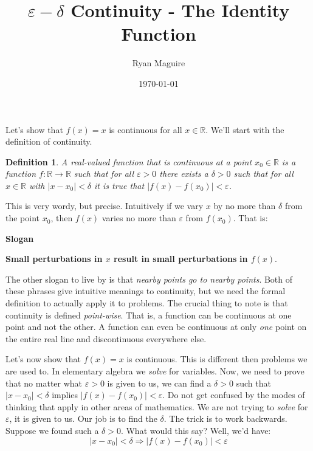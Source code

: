 \documentclass{article}
\title{$\varepsilon-\delta$ Continuity - The Identity Function}
\author{Ryan Maguire}
\date{\today}
\theoremstyle{normal}
\newtheorem{definition}{Definition}
\begin{document}
    \maketitle
    Let's show that $f(x)=x$ is continuous for all $x\in\mathbb{R}$. We'll
    start with the definition of continuity.
    \begin{definition}
        A real-valued function that is continuous at a point
        $x_{0}\in\mathbb{R}$ is a function $f:\mathbb{R}\rightarrow\mathbb{R}$
        such that for all $\varepsilon>0$ there exists a $\delta>0$ such that
        for all $x\in\mathbb{R}$ with $|x-x_{0}|<\delta$ it is true that
        $|f(x)-f(x_{0})|<\varepsilon$.
    \end{definition}
    This is very wordy, but precise. Intuitively if we vary $x$ by no more than
    $\delta$ from the point $x_{0}$, then $f(x)$ varies no more than
    $\varepsilon$ from $f(x_{0})$. That is:
    \begin{center}
        \textbf{Slogan}
        \par
        \textbf{Small perturbations in $x$ result in small perturbations}
        \textbf{in $f(x)$}.
    \end{center}
    The other slogan to live by is that
    \textit{nearby points go to nearby points}. Both of these phrases give
    intuitive meanings to continuity, but we need the formal definition to
    actually apply it to problems. The crucial thing to note is that
    continuity is defined \textit{point-wise}. That is, a function can be
    continuous at one point and not the other. A function can even be
    continuous at only \textit{one} point on the entire real line
    and discontinuous everywhere else.
    \par\hfill\par
    Let's now show that $f(x)=x$ is continuous. This is different then problems
    we are used to. In elementary algebra we \textit{solve} for variables. Now,
    we need to prove that no matter what $\varepsilon>0$ is given to us, we can
    find a $\delta>0$ such that $|x-x_{0}|<\delta$ implies
    $|f(x)-f(x_{0})|<\varepsilon$. Do not get confused by the modes of thinking
    that apply in other areas of mathematics. We are not trying to
    \textit{solve} for $\varepsilon$, it is given to us. Our job is to find
    the $\delta$. The trick is to work backwards. Suppose we
    found such a $\delta>0$. What would this say? Well, we'd have:
    \begin{equation}
        |x-x_{0}|<\delta\Rightarrow|f(x)-f(x_{0})|<\varepsilon
    \end{equation}
\end{document}
